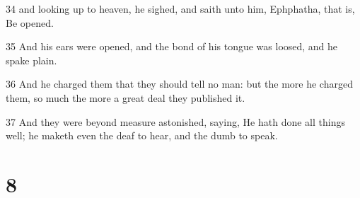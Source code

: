 \par 34 and looking up to heaven, he sighed, and saith unto him, Ephphatha, that is, Be opened.
\par 35 And his ears were opened, and the bond of his tongue was loosed, and he spake plain.
\par 36 And he charged them that they should tell no man: but the more he charged them, so much the more a great deal they published it.
\par 37 And they were beyond measure astonished, saying, He hath done all things well; he maketh even the deaf to hear, and the dumb to speak.

\chapter{8}

